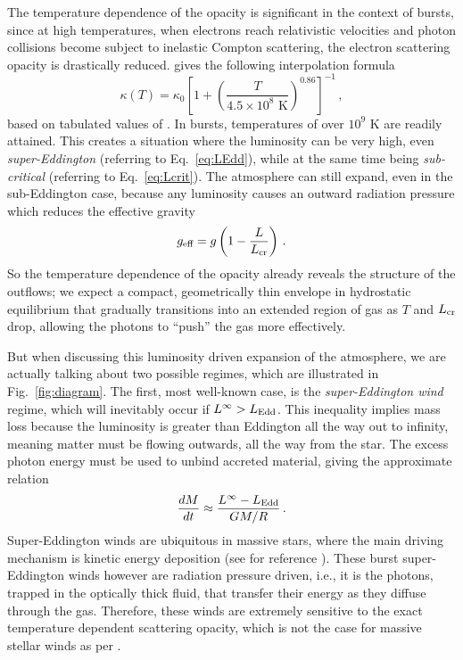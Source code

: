 \documentclass[../main.tex]{subfiles}
\begin{document}
The temperature dependence of the opacity is significant in the context of bursts, since at high temperatures, when electrons reach relativistic velocities and photon collisions become subject to inelastic Compton scattering, the electron scattering opacity is drastically reduced. \citet{Paczynski1983} gives the following interpolation formula
\begin{equation}\label{eq:kappa}
    \kappa(T)=\kappa_0 \left[1+\left(\frac{T}{4.5\times 10^8 \text{ K}}\right)^{0.86}\right]^{-1}\,,
\end{equation}
based on tabulated values of \citet{Buchler1976}. In bursts, temperatures of over $10^9$ K are readily attained. This creates a situation where the luminosity can be very high, even \textit{super-Eddington} (referring to Eq.~\ref{eq:LEdd}), while at the same time being \textit{sub-critical} (referring to Eq.~\ref{eq:Lcrit}). The atmosphere can still expand, even in the sub-Eddington case, because any luminosity causes an outward radiation pressure which reduces the effective gravity
\begin{equation}\label{eq:geff}
    g_\text{eff}=g\left(1-\frac{L}{L_\text{cr}}\right)\,.
\end{equation}
So the temperature dependence of the opacity already reveals the structure of the outflows; we expect a compact, geometrically thin envelope in hydrostatic equilibrium that gradually transitions into an extended region of gas as $T$ and $L_\text{cr}$ drop, allowing the photons to ``push'' the gas more effectively. 

But when discussing this luminosity driven expansion of the atmosphere, we are actually talking about two possible regimes, which are illustrated in Fig.~\ref{fig:diagram}. The first, most well-known case, is the \textit{super-Eddington wind} regime, which will inevitably occur if $L^\infty>L_\text{Edd}$. This inequality implies mass loss because the luminosity is greater than Eddington all the way out to infinity, meaning matter must be flowing outwards, all the way from the star. The excess photon energy must be used to unbind accreted material, giving the approximate relation
\begin{equation}
    \frac{dM}{dt}\approx \frac{L^\infty-L_\text{Edd}}{GM/R}\,.
\end{equation}
Super-Eddington winds are ubiquitous in massive stars, where the main driving mechanism is kinetic energy deposition (see for reference \citet{Quataert2016}).  These burst super-Eddington winds however are radiation pressure driven, i.e., it is the photons, trapped in the optically thick fluid, that transfer their energy as they diffuse through the gas. Therefore, these winds are extremely sensitive to the exact temperature dependent scattering opacity, which is not the case for massive stellar winds as per \citet{Quataert2016}. 
\end{document}
